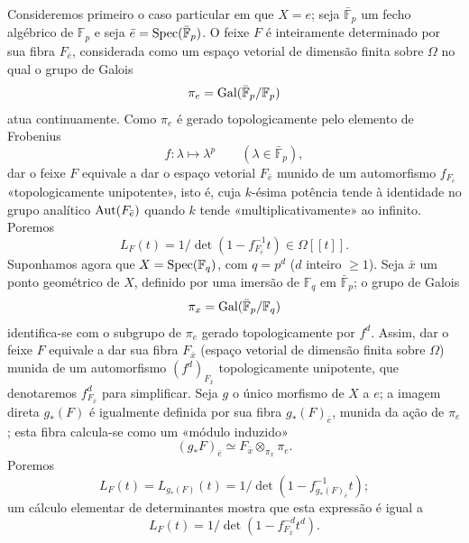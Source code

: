 Consideremos primeiro o caso particular em que $X=e$; seja $\bar{\mathbb F}_p$ um fecho algébrico de $\mathbb F_p$ e seja $\bar e=\operatorname{Spec}(\bar{\mathbb F}_p)$. O feixe $F$ é inteiramente determinado por sua fibra $F_{\bar e}$, considerada como um espaço vetorial de dimensão finita sobre $\Omega$ no qual o grupo de Galois
\[
\pi_e=\operatorname{Gal}(\bar{\mathbb F}_p/\mathbb F_p)
\]
atua continuamente. Como $\pi_e$ é gerado topologicamente pelo elemento de Frobenius
\[
f: \lambda\longmapsto \lambda^p\qquad(\lambda\in\bar{\mathbb F}_p),
\]
dar o feixe $F$ equivale a dar o espaço vetorial $F_{\bar e}$ munido de um automorfismo $f_{F_{\bar e}}$ «topologicamente unipotente», isto é, cuja $k$-ésima potência tende à identidade no grupo analítico $\operatorname{Aut}(F_{\bar e})$ quando $k$ tende «multiplicativamente» ao infinito. Poremos
\[
L_F(t)=1/\det(1-f_{F_{\bar e}}^{-1}t)\in\Omega[[t]].
\]
Suponhamos agora que $X=\operatorname{Spec}(\mathbb F_q)$, com $q=p^d$ ($d$ inteiro $\ge1$). Seja $\bar x$ um ponto geométrico de $X$, definido por uma imersão de $\mathbb F_q$ em $\bar{\mathbb F}_p$; o grupo de Galois
\[
\pi_x=\operatorname{Gal}(\bar{\mathbb F}_p/\mathbb F_q)
\]
identifica-se com o subgrupo de $\pi_e$ gerado topologicamente por $f^d$. Assim, dar o feixe $F$ equivale a dar sua fibra $F_{\bar x}$ (espaço vetorial de dimensão finita sobre $\Omega$) munida de um automorfismo $(f^d)_{F_{\bar x}}$ topologicamente unipotente, que denotaremos $f^d_{F_{\bar x}}$ para simplificar. Seja $g$ o único morfismo de $X$ a $e$; a imagem direta $g_*(F)$ é igualmente definida por sua fibra $g_*(F)_{\bar e}$, munida da ação de $\pi_e$; esta fibra calcula-se como um «módulo induzido»
\[
(g_*F)_{\bar e}\simeq F_{\bar x}\otimes_{\pi_x}\pi_e.
\]
Poremos
\[
L_F(t)=L_{g_*(F)}(t)=1/\det(1-f^{-1}_{g_*(F)_{\bar e}}t);
\]
um cálculo elementar de determinantes mostra que esta expressão é igual a
\[
L_F(t)=1/\det(1-f^{-d}_{F_{\bar x}}t^d).
\]
